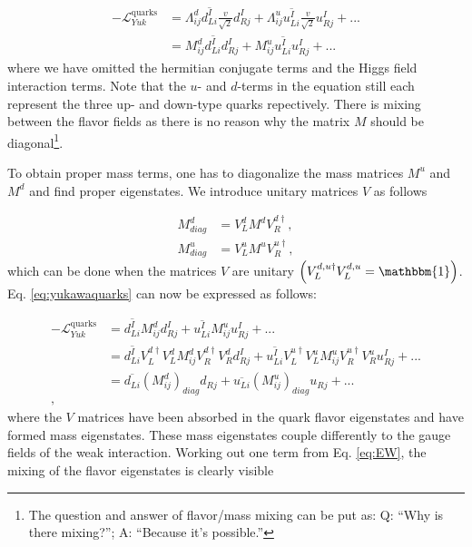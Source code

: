 \begin{equation}
\label{eq:yukawaquarks}
\begin{split}
-\mathcal{L}^{\textrm{quarks}}_{Yuk} &= \Lambda^d_{ij}\overline{d^I_{Li}} \frac{v}{\sqrt{2}}d^I_{Rj} + \Lambda^u_{ij} \overline{u^I_{Li}} \frac{v}{\sqrt{2}} u^I_{Rj} + ...\\
&= M^d_{ij} \overline{d^I_{Li}} d^I_{Rj} + M^u_{ij} \overline{u^I_{Li}} u^I_{Rj} + ...
\end{split}
\end{equation}
where we have omitted the hermitian conjugate terms and the Higgs field interaction terms. Note that the $u$- and $d$-terms in the equation still each represent the three up- and down-type quarks repectively. There is mixing between the flavor fields as there is no reason why the matrix $M$ should be diagonal\footnote{The question and answer of flavor/mass mixing can be put as: Q: ``Why is there mixing?''; A: ``Because it's possible.''}.

To obtain proper mass terms, one has to diagonalize the mass matrices $M^u$ and $M^d$ and find proper eigenstates. We introduce unitary matrices $V$ as follows

\begin{equation}
\begin{split}
M^d_{diag} &= V^d_L M^d V^{d\dagger}_R,\\
M^u_{diag} &= V^u_L M^u V^{u\dagger}_R,
\end{split}
\end{equation}
which can be done when the matrices $V$ are unitary $\left(V^{d,u\dagger}_L V^{d,u}_L = \mathbbm{1}\right)$. Eq. \ref{eq:yukawaquarks} can now be expressed as follows:

\begin{equation}
\begin{split}
-\mathcal{L}^{\textrm{quarks}}_{Yuk} &= \overline{d^I_{Li}} M^d_{ij} d^I_{Rj} + \overline{u^I_{Li}} M^u_{ij} u^I_{Rj} + ...\\
&= \overline{d^I_{Li}} V^{d\dagger}_L V^d_L M^d_{ij} V^{d\dagger}_R V^{d}_R d^I_{Rj} + \overline{u^I_{Li}} V^{u\dagger}_L V^u_L M^u_{ij} V^{u\dagger}_R V^u_R u^I_{Rj} + ...\\
&= \overline{d_{Li}} \left(M^d_{ij}\right)_{diag} d_{Rj} + \overline{u_{Li}} \left(M^u_{ij}\right)_{diag} u_{Rj} + ... \\,
\end{split}
\end{equation}
where the $V$ matrices have been absorbed in the quark flavor eigenstates and have formed mass eigenstates. These mass eigenstates couple differently to the gauge fields of the weak interaction. Working out one term from Eq. \ref{eq:EW}, the mixing of the flavor eigenstates is clearly visible

